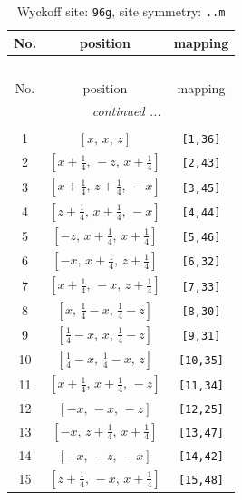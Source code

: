 \documentclass[fleqn,8pt]{jsarticle}
\begin{document}
\begin{longtable}{ccc}
\caption{Wyckoff site: {\tt 96g}, site symmetry: {\tt ..m}}
 \\
 \hline \hline
No. & position & mapping \\ \hline \endfirsthead

\multicolumn{2}{l}{\tablename\ \thetable{}} \\
 \hline \hline
No. & position & mapping \\ \hline \endhead

 \hline \hline
\multicolumn{2}{r}{\footnotesize\it continued ...} \\ \endfoot

 \hline \hline
\multicolumn{2}{r}{} \\ \endlastfoot

1 & $\left[ x,\, x,\, z \right]$ & {\tt [1,36]} \\ \hline
2 & $\left[ x + \frac{1}{4},\, - z,\, x + \frac{1}{4} \right]$ & {\tt [2,43]} \\ \hline
3 & $\left[ x + \frac{1}{4},\, z + \frac{1}{4},\, - x \right]$ & {\tt [3,45]} \\ \hline
4 & $\left[ z + \frac{1}{4},\, x + \frac{1}{4},\, - x \right]$ & {\tt [4,44]} \\ \hline
5 & $\left[ - z,\, x + \frac{1}{4},\, x + \frac{1}{4} \right]$ & {\tt [5,46]} \\ \hline
6 & $\left[ - x,\, x + \frac{1}{4},\, z + \frac{1}{4} \right]$ & {\tt [6,32]} \\ \hline
7 & $\left[ x + \frac{1}{4},\, - x,\, z + \frac{1}{4} \right]$ & {\tt [7,33]} \\ \hline
8 & $\left[ x,\, \frac{1}{4} - x,\, \frac{1}{4} - z \right]$ & {\tt [8,30]} \\ \hline
9 & $\left[ \frac{1}{4} - x,\, x,\, \frac{1}{4} - z \right]$ & {\tt [9,31]} \\ \hline
10 & $\left[ \frac{1}{4} - x,\, \frac{1}{4} - x,\, z \right]$ & {\tt [10,35]} \\ \hline
11 & $\left[ x + \frac{1}{4},\, x + \frac{1}{4},\, - z \right]$ & {\tt [11,34]} \\ \hline
12 & $\left[ - x,\, - x,\, - z \right]$ & {\tt [12,25]} \\ \hline
13 & $\left[ - x,\, z + \frac{1}{4},\, x + \frac{1}{4} \right]$ & {\tt [13,47]} \\ \hline
14 & $\left[ - x,\, - z,\, - x \right]$ & {\tt [14,42]} \\ \hline
15 & $\left[ z + \frac{1}{4},\, - x,\, x + \frac{1}{4} \right]$ & {\tt [15,48]} \\ \hline

\end{longtable}
\end{document}
